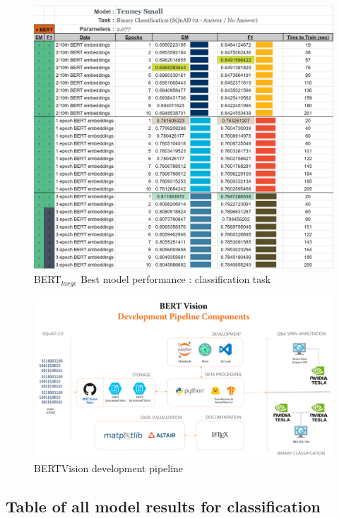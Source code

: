 \begin{figure}[h]
	\centering
	\includegraphics[width=\linewidth]{images/classification/TenneySmall_Training.png}%
	\caption{BERT$_{large}$ Best model performance : classification task}
\end{figure}

\newpage

\begin{figure}[t]
	\centering
	\includegraphics[width=\textwidth]{images/BERTVision_Development_PIpeline.png}%
	\caption{BERTVision development pipeline}
	\label{apdx:bertvision_development_pipeline_graph}
\end{figure}

\newpage

\subsection{Table of all model results for classification}
\label{apdx:classification_models_trained}

